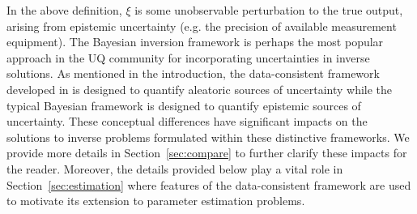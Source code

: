 In the above definition, $\xi$ is some unobservable perturbation to the true output, arising from epistemic uncertainty (e.g. the precision of available measurement equipment).
The Bayesian inversion framework  is perhaps the most popular approach in the UQ community for incorporating uncertainties in inverse solutions.
As mentioned in the introduction, the data-consistent framework developed in \cite{BJW18a, BJW18b, BWY20} is designed to quantify aleatoric sources of uncertainty while the typical Bayesian framework \citep{0266-5611-7-5-003,
 Kennedy_O_JRSSSB_2001, MNR07, CDS10, starktenorio,
 AlexanderianPetraStadlerEtAl14, Bui-ThanhGhattas14, Ernst2014,
 0266-5611-30-11-110301, ROM:CMW_2016, Stuart10,
 cockayneoatessullivangirolami} is designed to quantify epistemic sources of uncertainty.
These conceptual differences have significant impacts on the solutions to inverse problems formulated within these distinctive frameworks.
We provide more details in Section~\ref{sec:compare} to further clarify these impacts for the reader.
Moreover, the details provided below play a vital role in Section~\ref{sec:estimation} where features of the data-consistent framework are used to motivate its extension to parameter estimation problems.

\FloatBarrier
